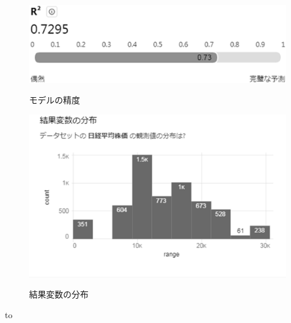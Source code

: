 \documentclass[submit,techrep,noauthor]{ipsj}
\begin{document}
\newpage
\begin{figure}[h]
\begin{center}
\label{INDEXNIKKEI_NI225_ReviewModelAccuracy}
\includegraphics[width=\linewidth]{./eps/INDEXNIKKEI_NI225_ReviewModelAccuracy.eps}
\caption{モデルの精度}
\vspace{-2mm}
\end{center}
\end{figure}
\vspace{-4mm}
\begin{figure}[h]
\begin{center}
\label{INDEXNIKKEI_NI225_TrainingDataandtheModel}
\includegraphics[width=\linewidth]{./eps/INDEXNIKKEI_NI225_TrainingDataandtheModel.eps}
\caption{結果変数の分布}
\vspace{-2mm}
\end{center}
\end{figure}
\vspace{-2mm}
\begin{table}[h] 
\caption{表の例} 
\label{tab:INDEXNIKKEI_NI225_correlation}
\hbox to
\newpage
\end{table}
\vspace{-2mm}
\end{document}
